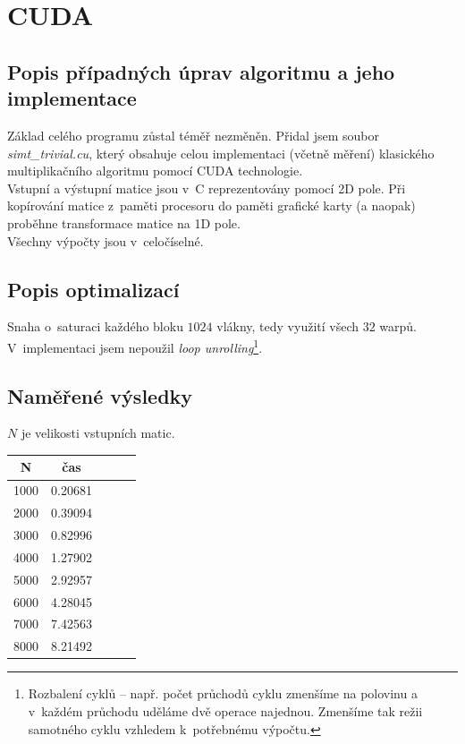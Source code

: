 \documentclass[12pt,a4paper]{article}
\begin{document}
\section{CUDA}
\subsection{Popis případných úprav algoritmu a jeho implementace}

Základ celého programu zůstal téměř nezměněn. Přidal jsem soubor \textit{simt\_trivial.cu}, který obsahuje celou implementaci (včetně měření) klasického multiplikačního algoritmu pomocí CUDA technologie. \\

Vstupní a výstupní matice jsou v~C reprezentovány pomocí 2D pole. Při kopírování matice z~paměti procesoru do paměti grafické karty (a naopak) proběhne transformace matice na 1D pole. \\

Všechny výpočty jsou v~celočíselné.


\subsection{Popis optimalizací}

Snaha o~saturaci každého bloku $1024$ vlákny, tedy využití všech $32$ warpů. \\

V~implementaci jsem nepoužil \textit{loop unrolling}\footnote{Rozbalení cyklů -- např. počet průchodů cyklu zmenšíme na polovinu a v~každém průchodu uděláme dvě operace najednou. Zmenšíme tak režii samotného cyklu vzhledem k~potřebnému výpočtu.}.


\subsection{Naměřené výsledky}

$N$ je velikosti vstupních matic.

\begin{center}
\begin{tabular}{ | c || c | c | c | c | }
\hline
N    &   čas	\\
\hline
\hline
1000    &   0.20681 	\\ \hline
2000    &   0.39094 	\\ \hline
3000    &   0.82996 	\\ \hline
4000    &   1.27902 	\\ \hline
5000    &   2.92957 	\\ \hline
6000    &   4.28045 	\\ \hline
7000    &   7.42563 	\\ \hline
8000    &   8.21492 	\\ \hline
\end{tabular}
\end{center}
\end{document}

